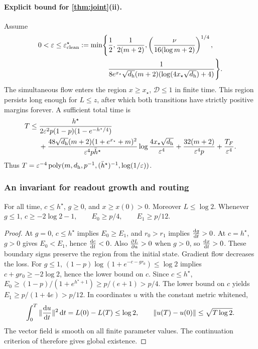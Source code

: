\paragraph{Explicit bound for \cref{thm:joint}(ii).}
Assume
\begin{equation}
 \begin{aligned}
 0<\varepsilon\le\varepsilon^\star_{\mathrm{clean}}:=\min\Biggl\{&\frac12,\frac1{2(m+2)},
 \left(\frac{\nu}{16(\log m+2)}\right)^{1/4},\\
 &\frac1{8e^{x_\star}\sqrt{d_{\mathrm h}}(m+2)(\log(4x_\star\sqrt{d_{\mathrm h}})+4)}\Biggr\}.
 \end{aligned}
 \label{eq:CR-scale}
\end{equation}
The simultaneous flow enters the region $x\ge x_\star$, $\mathcal D\le1$ in finite time. This region persists long enough for $L\le z$, after which both transitions have strictly positive margins forever. A sufficient total time is
\begin{align}
 T\le{}&\frac{h^\star}{2\varepsilon^2 p(1-p)(1-e^{-h^\star/4})}\notag\\
 &+\frac{48\sqrt{d_{\mathrm h}}(m+2)(1+e^{x_\star}+m)^2}{\varepsilon^4p\bar h^\star}
       \log\frac{4x_\star\sqrt{d_{\mathrm h}}}{\varepsilon^4}
 +\frac{32(m+2)}{\varepsilon^4p}+\frac{T_F}{\varepsilon^4}.\label{eq:CR-time}
\end{align}
Thus $T=\varepsilon^{-4}\operatorname{poly}(m,d_{\mathrm h},p^{-1},(\bar h^\star)^{-1},\log(1/\varepsilon))$.

\subsubsection{An invariant for readout growth and routing}
\begin{lemma}
\label{lem:CR-align}
For all time, $c\le h^\star$, $g\ge0$, and $x\ge x(0)>0$. Moreover $L\le\log2$. Whenever $g\le1$,
 $c\ge-2\log2-1,\qquad E_0\ge p/4,\qquad E_1\ge p/12.$ 
\end{lemma}
\begin{proof}
At $g=0$, $c\le h^\star$ implies $E_0\ge E_1$, and $r_0>r_1$ implies $\ddt{g}>0$.
At $c=h^\star$, $g>0$ gives $E_0<E_1$, hence $\ddt{c}<0$. Also $\pd{L}{a}>0$ when $g>0$, so $\ddt{x}>0$.
These boundary signs preserve the region from the initial state. Gradient flow decreases the loss.
For $g\le1$, $(1-p)\log(1+e^{-c-gr_0})\le\log2$ implies $c+gr_0\ge-2\log2$, hence the lower bound on $c$.
Since $c\le h^\star$,
$E_0\ge(1-p)/(1+e^{h^\star+1})\ge p/(e+1)>p/4$.
The lower bound on $c$ yields $E_1\ge p/(1+4e)>p/12$.
In coordinates $u$ with the constant metric whitened,
\[
 \int_0^T\|\ddt{u}\|^2\,\mathrm d t=L(0)-L(T)\le\log2,\qquad
 \|u(T)-u(0)\|\le\sqrt{T\log2}.
\]
The vector field is smooth on all finite parameter values. The continuation criterion of \citet[Corollary~2.15]{teschl2012ode} therefore gives global existence.
\end{proof}

